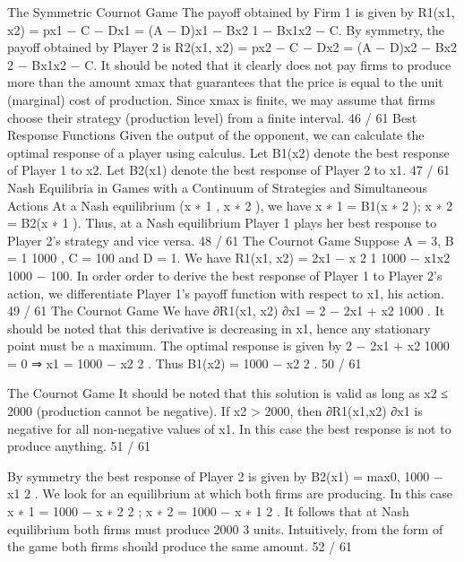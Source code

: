 The Symmetric Cournot Game
The payoff obtained by Firm 1 is given by
R1(x1, x2) = px1 − C − Dx1 = (A − D)x1 − Bx2
1 − Bx1x2 − C.
By symmetry, the payoff obtained by Player 2 is
R2(x1, x2) = px2 − C − Dx2 = (A − D)x2 − Bx2
2 − Bx1x2 − C.
It should be noted that it clearly does not pay firms to produce
more than the amount xmax that guarantees that the price is equal
to the unit (marginal) cost of production. Since xmax is finite, we
may assume that firms choose their strategy (production level)
from a finite interval.
46 / 61
Best Response Functions
Given the output of the opponent, we can calculate the optimal
response of a player using calculus.
Let B1(x2) denote the best response of Player 1 to x2.
Let B2(x1) denote the best response of Player 2 to x1.
47 / 61
Nash Equilibria in Games with a Continuum of Strategies
and Simultaneous Actions
At a Nash equilibrium (x
∗
1
, x
∗
2
), we have
x
∗
1 = B1(x
∗
2
); x
∗
2 = B2(x
∗
1
).
Thus, at a Nash equilibrium Player 1 plays her best response to
Player 2’s strategy and vice versa.
48 / 61
The Cournot Game
Suppose A = 3, B =
1
1000 , C = 100 and D = 1.
We have
R1(x1, x2) = 2x1 −
x
2
1
1000
−
x1x2
1000
− 100.
In order order to derive the best response of Player 1 to Player 2’s
action, we differentiate Player 1’s payoff function with respect to
x1, his action.
49 / 61
The Cournot Game
We have
∂R1(x1, x2)
∂x1
= 2 −
2x1 + x2
1000
.
It should be noted that this derivative is decreasing in x1, hence
any stationary point must be a maximum.
The optimal response is given by
2 −
2x1 + x2
1000
= 0 ⇒ x1 = 1000 −
x2
2
.
Thus B1(x2) = 1000 −
x2
2
.
50 / 61

The Cournot Game
It should be noted that this solution is valid as long as x2 ≤ 2000
(production cannot be negative).
If x2 > 2000, then ∂R1(x1,x2)
∂x1
is negative for all non-negative values
of x1.
In this case the best response is not to produce anything.
51 / 61

By symmetry the best response of Player 2 is given by
B2(x1) = max{0, 1000 −
x1
2
}.
We look for an equilibrium at which both firms are producing. In
this case
x
∗
1 = 1000 −
x
∗
2
2
; x
∗
2 = 1000 −
x
∗
1
2
.
It follows that at Nash equilibrium both firms must produce 2000
3
units.
Intuitively, from the form of the game both firms should produce
the same amount.
52 / 61

